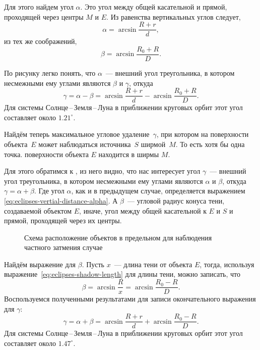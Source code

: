 Для этого найдем угол $\alpha$. Это угол между общей касательной и прямой, проходящей через центры $M$ и $E$. Из равенства вертикальных углов следует, 
\begin{equation}
    \alpha = \arcsin \frac{R + r}{d},
    \label{eq:eclipses-vertial-distance-alpha}
\end{equation}
из тех же соображений,
\begin{equation*}
    \beta = \arcsin \frac{R_0 + R}{D}.
\end{equation*}

По рисунку легко понять, что $\alpha$~--- внешний угол треугольника, в котором несмежными ему углами являются $\beta$ и $\gamma$, откуда
\begin{equation}
    \gamma = \alpha - \beta = \arcsin \frac{R + r}{d} - \arcsin \frac{R_0 + R}{D}.
\end{equation}
Для системы Солнце\,--\,Земля\,--\,Луна в приближении круговых орбит этот угол составляет около $1.21^\circ$.

Найдём теперь максимальное угловое удаление~$\gamma$, при котором на поверхности объекта~$E$ может наблюдаться  источника~$S$ ширмой~$M$. То есть хотя бы одна точка. поверхности объекта $E$ находится в  ширмы $M$.

 Для этого обратимся к , из него видно, что нас интересует угол $\gamma$~--- внешний угол треугольника, в котором несмежными ему углами являются $\alpha$ и $\beta$, откуда $\gamma = \alpha + \beta$. Где угол $\alpha$, как и в предыдущем случае, определяется выражением \eqref{eq:eclipses-vertial-distance-alpha}. А $\beta$~--- угловой радиус конуса тени, создаваемой объектом $E$, иначе, угол между общей касательной к $E$ и $S$ и прямой, проходящей через их центры.
 
 \begin{figure}[h!]
    \centering
    
    \caption{Схема расположение объектов в предельном для наблюдения частного затмения случае}
    \label{pic:partial-eclipse-vertical-distance}
\end{figure}

Найдём выражение для $\beta$. Пусть $x$~--- длина тени от объекта $E$, тогда, используя выражение~\eqref{eq:eclipses-shadow-length} для длины тени, можно записать, что 
\begin{equation*}
    \beta 
        = \arcsin \frac{R}{x} 
        = \arcsin\frac{R_0 - R}{D}.
    \label{eq:shadow-radius}
\end{equation*}
Воспользуемся полученными результатами для записи окончательного выражения для $\gamma$:
\begin{equation*}
    \gamma 
        = \alpha + \beta
        = \arcsin \frac{R + r}{d} + \arcsin\frac{R_0 - R}{D}.
\end{equation*}
Для системы Солнце\,--\,Земля\,--\,Луна в приближении круговых орбит этот угол составляет около $1.47^\circ$. 

